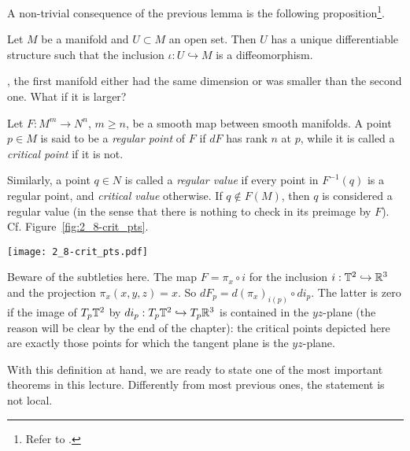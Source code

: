 A non-trivial consequence of the previous lemma is the following proposition\footnote{Refer to \cite[Proposition 5.8 and Proposition 5.31]{book:lee}.}.

\begin{proposition}\label{prop:uniqdiffeoinclusion}
  Let $M$ be a manifold and $U\subset M$ an open set.
  Then $U$ has a unique differentiable structure such that the inclusion $\iota:U\hookrightarrow M$ is a diffeomorphism.
\end{proposition}

, the first manifold either had the same dimension or was smaller than the second one.
What if it is larger?

\begin{definition}
  Let $F:M^m \to N^n$, $m\geq n$, be a smooth map between smooth manifolds.
  A point $p\in M$ is said to be a \emph{regular point} of $F$ if $dF$ has rank $n$ at $p$, while it is called a \emph{critical point} if it is not.

  Similarly, a point $q\in N$ is called a \emph{regular value} if every point in $F^{-1}(q)$ is a regular point, and \emph{critical value} otherwise. If $q\not\in F(M)$, then $q$ is considered a regular value (in the sense that there is nothing to check in its preimage by $F$).
  Cf. Figure~\ref{fig:2_8-crit_pts}.
\end{definition}
\begin{marginfigure}
  \texttt{[image: 2\_8-crit\_pts.pdf]}
  \caption{Beware of the subtleties here. The map $F=\pi_x\circ i$ for the inclusion $i:\mathbb{T}^2\hookrightarrow\mathbb{R}^3$ and the projection $\pi_x(x,y,z)=x$.
  So $dF_p = d (\pi_x)_{i(p)} \circ d i_p$. The latter is zero if the image of $T_p\mathbb{T}^2$ by $d i_p: T_p\mathbb{T}^2\hookrightarrow T_p\mathbb{R}^3$ is contained in the $yz$-plane (the reason will be clear by the end of the chapter): the critical points depicted here are exactly those points for which the tangent plane is the $yz$-plane.}
  \label{fig:2_8-crit_pts}
\end{marginfigure}

With this definition at hand, we are ready to state one of the most important theorems in this lecture. Differently from most previous ones, the statement is not local.

